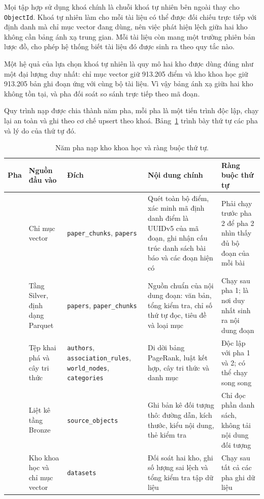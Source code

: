 Mọi tập hợp sử dụng khoá chính là chuỗi khoá tự nhiên bên ngoài thay cho \texttt{ObjectId}. Khoá tự nhiên làm cho mỗi tài liệu có thể được đối chiếu trực tiếp với định danh mà chỉ mục vector đang dùng, nên việc phát hiện lệch giữa hai kho không cần bảng ánh xạ trung gian. Mỗi tài liệu còn mang một trường phiên bản lược đồ, cho phép hệ thống biết tài liệu đó được sinh ra theo quy tắc nào.

Một hệ quả của lựa chọn khoá tự nhiên là quy mô hai kho được dùng đúng như một đại lượng duy nhất: chỉ mục vector giữ 913.205 điểm và kho khoa học giữ 913.205 bản ghi đoạn ứng với cùng bộ tài liệu. Vì vậy bảng ánh xạ giữa hai kho không tồn tại, và pha đối soát so sánh trực tiếp theo mã đoạn.

Quy trình nạp được chia thành năm pha, mỗi pha là một tiến trình độc lập, chạy lại an toàn và ghi theo cơ chế upsert theo khoá. Bảng~\ref{tab:nam-pha-nap} trình bày thứ tự các pha và lý do của thứ tự đó.

\begin{table}[htbp]
    \centering
    \caption{Năm pha nạp kho khoa học và ràng buộc thứ tự.}
    \label{tab:nam-pha-nap}
    \footnotesize
    \begin{tabularx}{\textwidth}{@{}>{\raggedright\arraybackslash}p{0.8cm}>{\raggedright\arraybackslash}p{2.65cm}>{\raggedright\arraybackslash}p{2.9cm}>{\raggedright\arraybackslash}p{4.35cm}>{\raggedright\arraybackslash}X@{}}
        \toprule
        \textbf{Pha} & \textbf{Nguồn đầu vào} & \textbf{Đích} & \textbf{Nội dung chính} & \textbf{Ràng buộc thứ tự} \\
        \midrule
        1 & Chỉ mục vector & \texttt{paper\_chunks}, \texttt{papers} & Quét toàn bộ điểm, xác minh mã định danh điểm là UUIDv5 của mã đoạn, ghi nhận cấu trúc danh sách bài báo và các đoạn hiện có & Phải chạy trước pha 2 để pha 2 nhìn thấy đủ bộ đoạn của mỗi bài \\
        2 & Tầng Silver, định dạng Parquet & \texttt{papers}, \texttt{paper\_chunks} & Nguồn chuẩn của nội dung đoạn: văn bản, tổng kiểm tra, chỉ số thứ tự đọc, tiêu đề và loại mục & Chạy sau pha 1; là nơi duy nhất sinh ra nội dung đoạn \\
        3 & Tệp khai phá và cây tri thức & \texttt{authors}, \texttt{association\_\allowbreak rules}, \texttt{world\_nodes}, \texttt{categories} & Di dời bảng PageRank, luật kết hợp, cây tri thức và danh mục & Độc lập với pha 1 và 2; có thể chạy song song \\
        4 & Liệt kê tầng Bronze & \texttt{source\_objects} & Ghi bản kê đối tượng thô: đường dẫn, kích thước, kiểu nội dung, thẻ kiểm tra & Chỉ đọc phần danh sách, không tải nội dung đối tượng \\
        5 & Kho khoa học và chỉ mục vector & \texttt{datasets} & Đối soát hai kho, ghi số lượng sai lệch và tổng kiểm tra tập dữ liệu & Chạy sau tất cả các pha ghi dữ liệu \\
        \bottomrule
    \end{tabularx}
\end{table}

